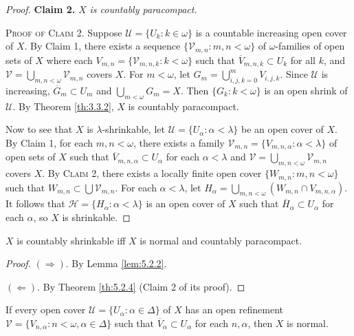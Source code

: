 \documentclass[jisng5i.tex]{subfiles}
\begin{document}
\begin{proof}
\textbf{Claim 2.} \textit{\(X\) is countably paracompact.}

\noindent\textsc{Proof of Claim 2}. Suppose $\mathscr{U} = \{U_k: k \in \omega\}$ is a 
countable increasing open cover of $X$. By Claim 1, there exists a sequence 
$\{\mathscr{V}_{m,n}: m, n < \omega\}$ of $\omega$-families of open sets of $X$ 
where each
$V_{m,n} = \{\mathscr{V}_{m,n,k}: k < \omega\}$
such that $\overline{V}_{m,n,k} \subset U_k$ for all $k$, and 
$\mathscr{V} = \bigcup_{m,n < \omega} \mathscr{V}_{m,n}$ covers $X$.
For $m < \omega$, let $G_m = \bigcup_{i,j,k=0}^m V_{i,j,k}$.
Since $\mathscr{U}$ is increasing, $\overline{G}_m \subset U_m$ and  
$\bigcup_{m < \omega} G_m = X$. Then
$\{G_k: k < \omega\}$ is an open shrink of $\mathscr{U}$. By Theorem \ref{th:3.3.2}, 
$X$ is countably paracompact.

Now to see that $X$ is $\lambda$-shrinkable, 
let $\mathscr{U} = \{U_\alpha: \alpha < \lambda\}$ be an open cover of $X$. By Claim 1, 
for each $m, n < \omega$, there exists a family 
$\mathscr{V}_{m,n} = \{V_{m,n,\alpha}: \alpha< \lambda\}$ of open sets of $X$ such that 
$\overline{V}_{m,n,\alpha} \subset U_\alpha$ for each $\alpha<\lambda$ and 
$\mathscr{V} = \bigcup_{m,n < \omega} \mathscr{V}_{m,n}$ covers $X$. By \textsc{Claim 2},
 there exists a locally finite open cover $\{W_{m,n}: m, n < \omega\}$ such that 
 $W_{m,n} \subset \bigcup\mathscr{V}_{m,n}$. 
 For each $\alpha < \lambda$, let 
 $H_\alpha = \bigcup_{m,n < \omega} (W_{m,n} \cap V_{m,n,\alpha})$.
It follows that $\mathscr{H} = \{H_\alpha: \alpha < \lambda\}$ is an open cover of $X$ such that 
$\overline{H}_\alpha \subset U_\alpha$ for each $\alpha$, so $X$ is shrinkable.
\end{proof}

{\corollary{} \label{cor:5.2.5}
 $X$ is countably shrinkable iff $X$ is normal and countably paracompact.
}

\begin{proof}
\((\Rightarrow)\). By Lemma \ref{lem:5.2.2}. 

\((\Leftarrow)\). By Theorem \ref{th:5.2.4} (Claim 2 of its proof).
\end{proof}

{\lemma{} \label{lem:5.2.6}
If every open cover $\mathscr{U} = \{U_\alpha: \alpha\in \Delta\}$ of $X$ has an open refinement
$\mathscr{V} = \{V_{n, \alpha}: n < \omega, \alpha\in\Delta\}$ such that 
$\overline{V}_\alpha \subset U_\alpha$ for each $n, \alpha$, then
$X$ is normal.
}
\end{document}
